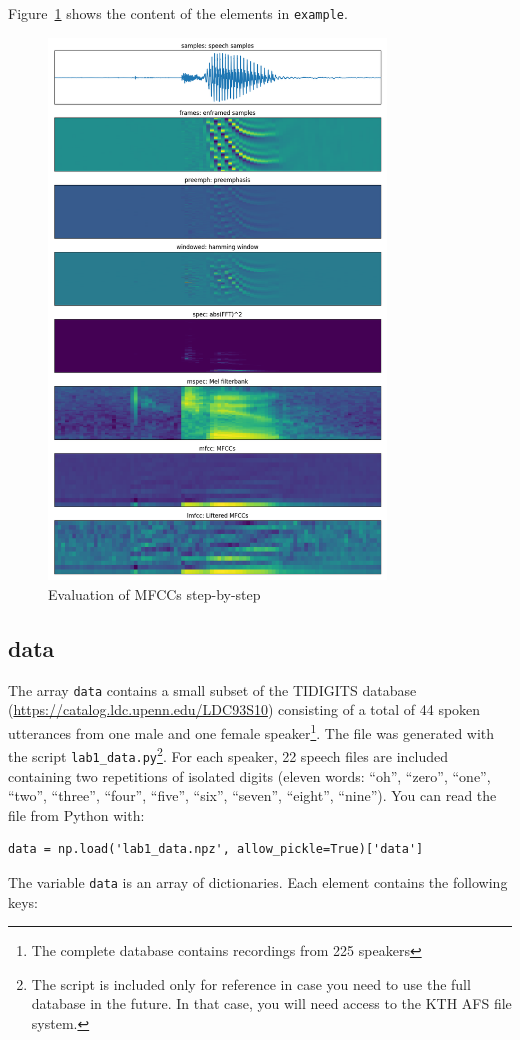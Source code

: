 \documentclass{nada-ten}
\begin{document}
Figure~\ref{fig:mfcc} shows the content of the elements in \texttt{example}.
\begin{figure}
  \centering
  \includegraphics[width=0.8\textwidth]{MFCC_step_by_step}
  \caption{Evaluation of MFCCs step-by-step}
  \label{fig:mfcc}
\end{figure}

\subsection{data}
The array \texttt{data} contains a small subset of the TIDIGITS database (\url{https://catalog.ldc.upenn.edu/LDC93S10}) consisting of a total of 44 spoken utterances from one male and one female speaker\footnote{The complete database contains recordings from 225 speakers}. The file was generated with the script \verb|lab1_data.py|\footnote{The script is included only for reference in case you need to use the full database in the future. In that case, you will need access to the KTH AFS file system.}. For each speaker, 22 speech files are included containing two repetitions of isolated digits (eleven words: ``oh'', ``zero'', ``one'', ``two'', ``three'', ``four'', ``five'', ``six'', ``seven'', ``eight'', ``nine''). You can read the file from Python with:
\begin{verbatim}
data = np.load('lab1_data.npz', allow_pickle=True)['data']
\end{verbatim}
The variable \verb|data| is an array of dictionaries. Each element contains the following keys:
\end{document}
